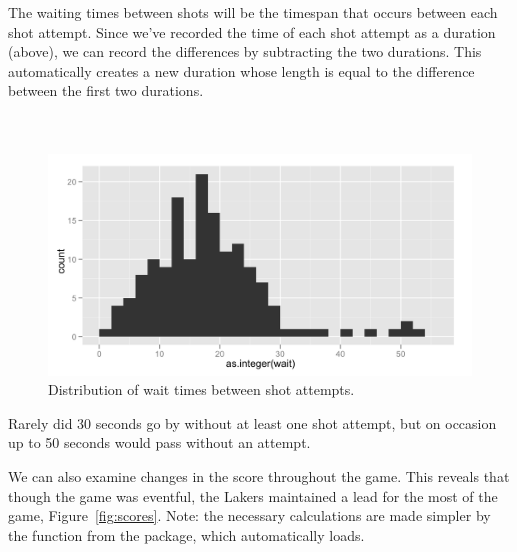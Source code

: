 \documentclass[article]{jss}
\begin{document}
The waiting times between shots will be the timespan that occurs between each shot attempt. Since we've recorded the time of each shot attempt as a duration (above), we can record the differences by subtracting the two durations. This automatically creates a new duration whose length is equal to the difference between the first two durations.\\

\\
\\

\begin{figure}[htpb]
  \centering
  \includegraphics[width=\textwidth]{wait-histogram.png}        
  \caption{Distribution of wait times between shot attempts.}
  \label{fig:waits}
\end{figure}

Rarely did 30 seconds go by without at least one shot attempt, but on occasion up to 50 seconds would pass without an attempt.

We can also examine changes in the score throughout the game. This reveals that though the game was eventful, the Lakers maintained a lead for the most of the game, Figure~\ref{fig:scores}. Note: the necessary calculations are made simpler by the  function from the  package, which  automatically loads. \\

\\
\\
\\
\end{document}
